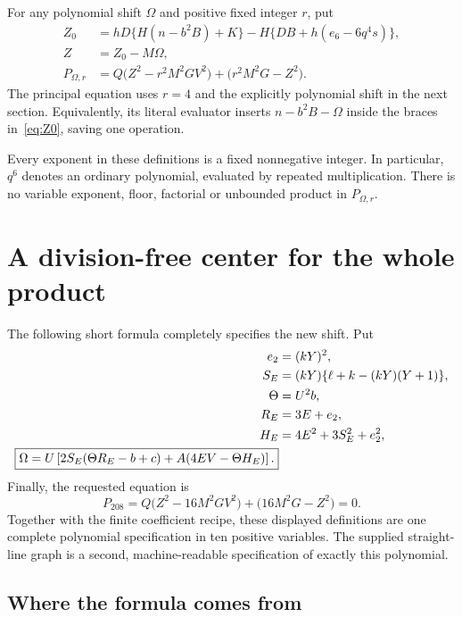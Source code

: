 \documentclass[11pt]{article}
\theoremstyle{remark}\newtheorem{remark}[theorem]{Remark}
\begin{document}
For any polynomial shift $\Omega$ and positive fixed integer $r$, put
\begin{align}
 Z_0&=hD\{H(n-b^2B)+K\}-H\{DB+h(e_6-6q^4s)\},\label{eq:Z0}\\
 Z&=Z_0-M\Omega,\label{eq:Z}\\
 P_{\Omega,r}
 &=Q\bigl(Z^2-r^2M^2GV^2\bigr)+\bigl(r^2M^2G-Z^2\bigr).
 \label{eq:generalP}
\end{align}
The principal equation uses $r=4$ and the explicitly polynomial shift in
the next section. Equivalently, its literal evaluator inserts
$n-b^2B-\Omega$ inside the braces in~\eqref{eq:Z0}, saving one operation.

Every exponent in these definitions is a fixed nonnegative integer.
In particular, $q^6$ denotes an ordinary polynomial, evaluated by repeated
multiplication. There is no variable exponent, floor, factorial or
unbounded product in $P_{\Omega,r}$.

\section{A division-free center for the whole product}\label{sec:center}

The following short formula completely specifies the new shift. Put
\begin{align}
 e_2&=(kY)^2,\notag\\
 S_E&=(kY)\{\ell+k-(kY)(Y+1)\},\notag\\
 \Theta&=U^2b,\notag\\
 R_E&=3E+e_2,\notag\\
 H_E&=4E^2+3S_E^2+e_2^2,\notag\\
 \boxed{\displaystyle
 \Omega=U\left[2S_E(\Theta R_E-b+c)
           +A(4EV-\Theta H_E)\right].}\label{eq:Omega}
\end{align}
Finally, the requested equation is
\begin{equation}\label{eq:main}
 \boxed{\displaystyle
 P_{208}=Q\bigl(Z^2-16M^2GV^2\bigr)
               +\bigl(16M^2G-Z^2\bigr)=0.}
\end{equation}
Together with the finite coefficient recipe, these displayed definitions
are one complete polynomial specification in ten positive variables.
The supplied straight-line graph is a second, machine-readable
specification of exactly this polynomial.

\subsection{Where the formula comes from}
\end{document}
